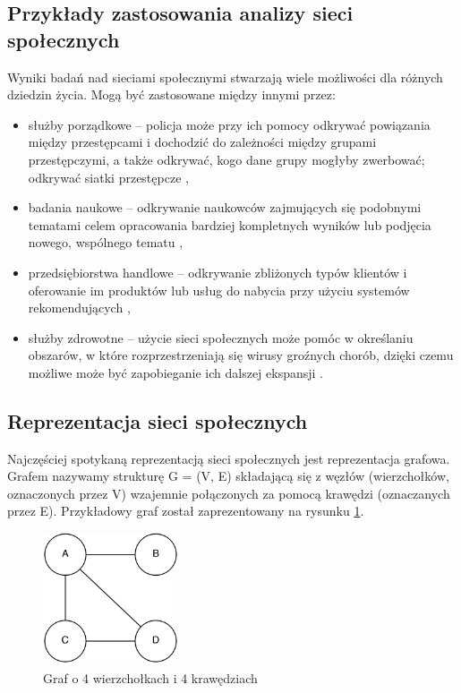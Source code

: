 \subsection{Przykłady zastosowania analizy sieci społecznych}
Wyniki badań nad sieciami społecznymi stwarzają wiele możliwości dla różnych
dziedzin życia. Mogą być zastosowane między innymi przez:
\begin{itemize}
  \item służby porządkowe -- policja może przy ich pomocy odkrywać powiązania
  między przestępcami i dochodzić do zależności między grupami przestępczymi,
  a także odkrywać, kogo dane grupy mogłyby zwerbować; odkrywać siatki 
  przestępcze \cite{SNACriminal},
  
  \item badania naukowe -- odkrywanie naukowców zajmujących się podobnymi
  tematami celem opracowania bardziej kompletnych wyników lub podjęcia nowego,
  wspólnego tematu \cite{SNAScientists},
  
  \item przedsiębiorstwa handlowe -- odkrywanie zbliżonych typów klientów i 
  oferowanie im produktów lub usług do nabycia przy użyciu systemów 
  rekomendujących \cite{SNAReccomendation},
  
  \item służby zdrowotne -- użycie sieci społecznych może pomóc w określaniu
  obszarów, w które rozprzestrzeniają się wirusy groźnych chorób, dzięki czemu
  możliwe może być zapobieganie ich dalszej ekspansji \cite{SNAEpidemic}.
  
    
\end{itemize}



\subsection{Reprezentacja sieci społecznych}
Najczęściej spotykaną reprezentacją sieci społecznych jest reprezentacja
grafowa. Grafem nazywamy strukturę G = (V, E) składającą się z węzłów
(wierzchołków, oznaczonych przez V) wzajemnie połączonych za pomocą krawędzi
(oznaczanych przez E). Przykładowy graf został zaprezentowany na rysunku
\ref{image:graf-zwykly}.

\begin{figure}[ht!]
\centering
\includegraphics[width=40mm]{img/graf-zwykly.png}
\caption{Graf o 4 wierzchołkach i 4 krawędziach}
\label{image:graf-zwykly}
\end{figure}

